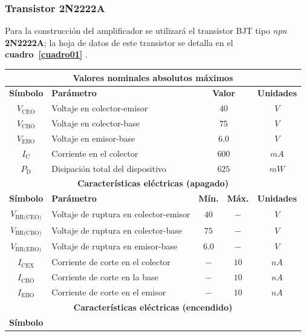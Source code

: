 \subsubsection{Transistor 2N2222A}
Para la construcción del amplificador se utilizará el transistor BJT tipo
\emph{npn} \textbf{2N2222A}; la hoja de datos de este transistor se detalla en
el \textbf{cuadro~\ref{cuadro01}} \cite{2N2222A}.

\begin{table}[!ht]
\begin{center}
    \begin{tabular}{|c|l|c|c|c|}
    \hline
    \multicolumn{5}{|c|}{\textbf{Valores nominales absolutos máximos}}
    \tabularnewline \hline
    \textbf{Símbolo} &
    \textbf{Parámetro} &
    \multicolumn{2}{|c|}{\textbf{Valor}} &
    \textbf{Unidades}
    \tabularnewline \hline \hline
    $V_{\text{CEO}}$ &
    Voltaje en colector-emisor &
    \multicolumn{2}{|c|}{$40$} & $V$
    \tabularnewline \hline
    $V_{\text{CBO}}$ &
    Voltaje en colector-base &
    \multicolumn{2}{|c|}{$75$} &
    $V$
    \tabularnewline \hline
    $V_{\text{EBO}}$ &
    Voltaje en emisor-base &
    \multicolumn{2}{|c|}{$6.0$} &
    $V$
    \tabularnewline \hline
    $I_{\text{C}}$ &
    Corriente en el colector &
    \multicolumn{2}{|c|}{$600$} &
    $mA$
    \tabularnewline \hline
    $P_{\text{D}}$ &
    Disipación total del dispositivo &
    \multicolumn{2}{|c|}{$625$} &
    $mW$
    \tabularnewline \hline \hline
    \multicolumn{5}{|c|}{\textbf{Características eléctricas (apagado)}}
    \tabularnewline \hline
    \textbf{Símbolo} &
    \textbf{Parámetro} &
    \textbf{Mín.} &
    \textbf{Máx.} &
    \textbf{Unidades}
    \tabularnewline \hline \hline
    $V_{\text{BR(CEO)}}$ &
    Voltaje de ruptura en colector-emisor &
    $40$ &
    $-$ &
    $V$
    \tabularnewline \hline
    $V_{\text{BR(CBO)}}$ &
    Voltaje de ruptura en colector-base &
    $75$ &
    $-$ &
    $V$
    \tabularnewline \hline
    $V_{\text{BR(EBO)}}$ &
    Voltaje de ruptura en emisor-base &
    $6.0$ &
    $-$ &
    $V$
    \tabularnewline \hline
    $I_{\text{CEX}}$ &
    Corriente de corte en el colector &
    $-$ &
    $10$ &
    $nA$
    \tabularnewline \hline
    $I_{\text{CBO}}$ &
    Corriente de corte en la base &
    $-$ &
    $10$ &
    $nA$
    \tabularnewline \hline
    $I_{\text{EBO}}$ &
    Corriente de corte en el emisor &
    $-$ &
    $10$ &
    $nA$
    \tabularnewline \hline \hline
    \multicolumn{5}{|c|}{\textbf{Características eléctricas (encendido)}}
    \tabularnewline \hline
    \textbf{Símbolo} &

\end{tabular}
\end{center}
\end{table}
